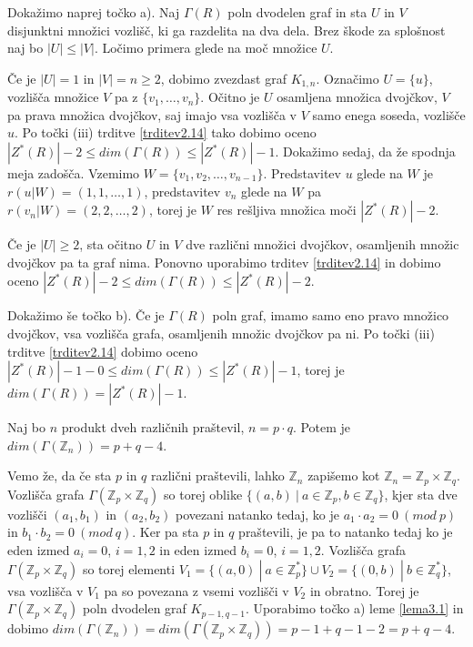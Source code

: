 \documentclass[mat1, tisk]{fmfdelo}
\newcommand{\Z}{\mathbb Z}
\begin{document}
\begin{dokaz}
  Dokažimo naprej točko a).
  Naj $\Gamma(R)$ poln dvodelen graf in sta $U$ in $V$ disjunktni množici vozlišč, ki ga razdelita na 
  dva dela. Brez škode za splošnost naj bo $|U| \leq |V|$. Ločimo primera glede na moč množice $U$.

  Če je $|U| = 1$ in $|V| = n \geq 2$, dobimo zvezdast graf $K_{1,n}$. Označimo $U = \{u\}$, vozlišča množice 
  $V$ pa z $\{v_1, \ldots, v_n\}$. Očitno je $U$ osamljena množica dvojčkov, $V$ pa prava množica dvojčkov, 
  saj imajo vsa vozlišča v $V$ samo enega soseda, vozlišče $u$. Po točki (iii) trditve \ref{trditev2.14} tako 
  dobimo oceno $|Z^*(R)| - 2 \leq dim(\Gamma(R)) \leq |Z^*(R)| - 1$. Dokažimo sedaj, da že spodnja meja   
  zadošča. Vzemimo $W = \{v_1, v_2, \ldots, v_{n-1}\}$. Predstavitev $u$ glede na $W$ je 
  $r(u|W)=( 1, 1, \ldots, 1 )$, predstavitev $v_n$ glede na $W$ pa $r(v_n|W)=( 2, 2, \ldots, 2 )$, torej 
  je $W$ res rešljiva množica moči $|Z^*(R)| - 2$.

  Če je $|U| \geq 2$, sta očitno $U$ in $V$ dve različni množici dvojčkov, osamljenih množic dvojčkov 
  pa ta graf nima. Ponovno uporabimo trditev \ref{trditev2.14} in dobimo oceno 
  $|Z^*(R)| - 2 \leq dim(\Gamma(R)) \leq |Z^*(R)| - 2$.

  Dokažimo še točko b). Če je $\Gamma(R)$ poln graf, imamo samo eno pravo množico dvojčkov, vsa vozlišča grafa, 
  osamljenih množic dvojčkov pa ni. Po točki (iii) trditve \ref{trditev2.14} dobimo oceno 
  $|Z^*(R)| - 1 - 0 \leq dim(\Gamma(R)) \leq |Z^*(R)| - 1$, torej je $dim(\Gamma(R)) = |Z^*(R)| - 1$.
\end{dokaz}
%
\begin{trditev}
  Naj bo $n$ produkt dveh različnih praštevil, $n = p \cdot q$. Potem je 
  $dim(\Gamma(\Z_{n})) = p + q - 4$.
\end{trditev}
\begin{dokaz}
  Vemo že, da če sta $p$ in $q$ različni praštevili, lahko $\Z_{n}$ zapišemo kot 
  $\Z_{n} = \Z_{p} \times \Z_{q}$. Vozlišča grafa $\Gamma(\Z_{p} \times \Z_{q})$ so 
  torej oblike $ \{(a,b)~|~a \in \Z_{p}, b \in \Z_{q}\}$, kjer sta dve vozlišči $(a_1, b_1)$ in 
  $(a_2, b_2)$ povezani natanko tedaj, ko je $a_1 \cdot a_2 = 0~(mod~p)$ in $b_1 \cdot b_2 = 0~(mod~q)$. 
  Ker pa sta $p$ in $q$ praštevili, je pa to natanko tedaj ko je eden izmed $a_i = 0$, $i = 1,2$ 
  in eden izmed $b_i = 0$, $i = 1,2$. Vozlišča grafa $\Gamma(\Z_{p} \times \Z_{q})$ so torej 
  elementi $V_1 = \{ (a,0)~|~a \in \Z_{p}^*\} \cup V_2 = \{ (0,b)~|~b \in \Z_{q}^*\}$, vsa 
  vozlišča v $V_1$ pa so povezana z vsemi vozlišči v $V_2$ in obratno. 
  Torej je $\Gamma(\Z_{p} \times \Z_{q})$ poln dvodelen graf $K_{p-1, q-1}$. Uporabimo točko a)
  leme \ref{lema3.1} in dobimo $dim(\Gamma(\Z_{n})) = dim(\Gamma(\Z_{p} \times \Z_{q})) = p - 1 + q - 1 - 2 = p + q - 4$.
\end{dokaz}
\end{document}
